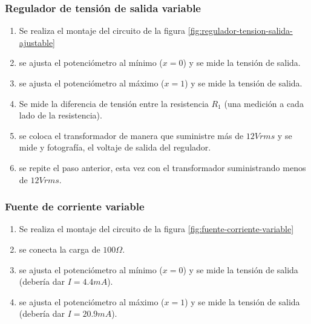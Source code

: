 \subsubsection*{Regulador de tensión de salida variable}

\begin{enumerate}
    \item Se realiza el montaje del circuito de la figura \ref{fig:regulador-tension-salida-ajustable}
    \item se ajusta el potenciómetro al mínimo ($x = 0$) y se mide la tensión de salida.
    \item se ajusta el potenciómetro al máximo ($x = 1$) y se mide la tensión de salida.
    \item Se mide la diferencia de tensión entre la resistencia $R_1$ (una medición a cada lado de la resistencia).
    \item se coloca el transformador de manera que suministre más de $12Vrms$ y se mide y fotografía, el voltaje de salida del regulador.
    \item se repite el paso anterior, esta vez con el transformador suministrando menos de $12Vrms$.
\end{enumerate}

\subsubsection*{Fuente de corriente variable}

\begin{enumerate}
    \item Se realiza el montaje del circuito de la figura \ref{fig:fuente-corriente-variable}
    \item se conecta la carga de $100 \Omega$.
    \item se ajusta el potenciómetro al mínimo ($x = 0$) y se mide la tensión de salida (debería dar $I= 4.4 mA$).
    \item se ajusta el potenciómetro al máximo ($x = 1$) y se mide la tensión de salida (debería dar $I= 20.9 mA$).
\end{enumerate}